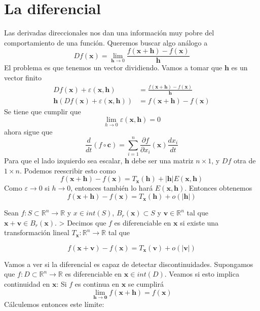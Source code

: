 \documentclass{./Calculo.tex}
\begin{document}
\section{La diferencial}
Las derivadas direccionales nos dan una información muy pobre del comportamiento de una función. Queremos buscar algo análogo a
$$
Df(\mathbf{x})=\lim_{ \mathbf{h} \to 0 } \frac{f(\mathbf{x}+\mathbf{h})-f(\mathbf{x})}{\mathbf{h}}
$$
El problema es que tenemos un vector dividiendo. Vamos a tomar que $\mathbf{h}$ es un vector finito
\begin{equation}
	\begin{split}
Df(\mathbf{x})+\varepsilon(\mathbf{x},\mathbf{h})&=\frac{f(\mathbf{x}+\mathbf{h})-f(\mathbf{x})}{\mathbf{h}}\\
\mathbf{h}(Df(\mathbf{x})+\varepsilon(\mathbf{x},\mathbf{h}))&=f(\mathbf{x}+\mathbf{h})-f(\mathbf{x})
	\end{split}
\end{equation}
Se tiene que cumplir que
$$
\lim_{ h \to 0 } \varepsilon(\mathbf{x},\mathbf{h})=0
$$
ahora sigue que
\[
\frac{d}{dt} (f\circ \mathbf{c}) = \sum_{i=1}^{n} \frac{ \partial f }{ \partial x_{i} }(\mathbf{x}) \frac{d x_{i}}{dt}  
\]
Para que el lado izquierdo sea escalar, $\mathbf{h}$ debe ser una matriz $n\times 1$, y $Df$ otra de $1\times n$. Podemos reescribir esto como
$$
f(\mathbf{x}+\mathbf{h})-f(\mathbf{x})=T_{\mathbf{x}}(\mathbf{h})+|\mathbf{h}|E(\mathbf{x},\mathbf{h})
$$
Como $\varepsilon\to {0}$ si $h\to 0$, entonces también lo hará $E(\mathbf{x},\mathbf{h})$. Entonces obtenemos
$$
f(\mathbf{x}+\mathbf{h})-f(\mathbf{x})=T_{\mathbf{x}}(\mathbf{h})+o(|\mathbf{h}|)
$$
\begin{defin}
Sean $f:S\subset \mathbb{R}^n\to \mathbb{R}$ y $x \in int(S)$, $B_{r}(\mathbf{x})\subset S$ y $\mathbf{v}\in \mathbb{R}^{n}$ tal que $\mathbf{x}+\mathbf{v}\in B_{r}(\mathbf{x})$.
> Decimos que $f$ es diferenciable en $\mathbf{x}$ si existe una transformación lineal $T_{\mathbf{x}}:\mathbb{R}^{n}\to \mathbb{R}$ tal que
 
$$
f(\mathbf{x}+\mathbf{v})-f(\mathbf{x})=T_{\mathbf{x}}(\mathbf{v})+o(|\mathbf{v}|)
$$
\end{defin}
Vamos a ver si la diferencial es capaz de detectar discontinuidades.
Supongamos que $f:D\subset \mathbb{R}^n\to \mathbb{R}$ es diferenciable en $\mathbf{x}\in int(D)$. Veamos si esto implica continuidad en $\mathbf{x}$:
Si $f$ es continua en $\mathbf{x}$ se cumplirá
$$
\lim_{ \mathbf{h} \to \mathbf{0} } f(\mathbf{x}+\mathbf{h})=f(\mathbf{x})
$$
Cálculemos entonces este límite:
\end{document}
